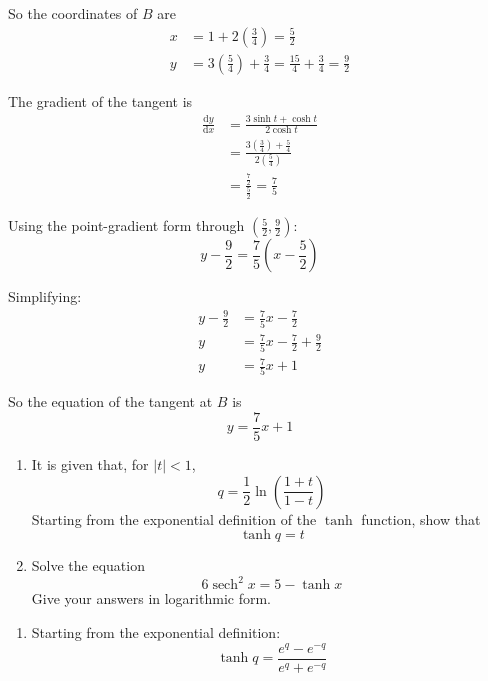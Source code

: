 \documentclass[leqno]{article}
\begin{document}
\begin{enumerate}[
  label=\textbf{\arabic*.},
  leftmargin=*,
  topsep=0pt,
  partopsep=0pt,
  parsep=0pt
]
\begin{djsSolution}
\begin{enumerate}[label=\textbf{(\alph*)}]
  So the coordinates of $B$ are
  \begin{align*}
  x&=1+2\left(\frac34\right)=\frac52\\
  y&=3\left(\frac54\right)+\frac34=\frac{15}{4}+\frac34=\frac92
  \end{align*}

  The gradient of the tangent is
  \begin{align*}
  \frac{\mathrm{d}y}{\mathrm{d}x}
  &=\frac{3\sinh t+\cosh t}{2\cosh t}\\
  &=\frac{3\left(\frac34\right)+\frac54}{2\left(\frac54\right)}\\
  &=\frac{\frac72}{\frac52}
  =\frac75
  \end{align*}

  Using the point-gradient form through $\left(\frac52,\frac92\right)$:
  \[
  y-\frac92=\frac75\left(x-\frac52\right)
  \]

  Simplifying:
  \begin{align*}
  y-\frac92&=\frac75x-\frac72\\
  y&=\frac75x-\frac72+\frac92\\
  y&=\frac75x+1
  \end{align*}

  So the equation of the tangent at $B$ is
  \[
  y=\frac75x+1
  \]
\end{enumerate}
\end{djsSolution}


\newpage

\questionitem

\begin{enumerate}[label=\textbf{(\alph*)}]
  \item It is given that, for $|t|<1$,
  \[
  q = \frac{1}{2}\ln\left(\frac{1+t}{1-t}\right)
  \]
  Starting from the exponential definition of the $\tanh$ function, show that
  \[
  \tanh q = t
  \]
  \item Solve the equation
  \[
  6\operatorname{sech}^2 x = 5 - \tanh x
  \]
  Give your answers in logarithmic form.  \\
\end{enumerate}

\vspace*{10pt}

\begin{djsSolution}
\begin{enumerate}[label=\textbf{(\alph*)}]
  \item Starting from the exponential definition:
\[
\tanh q=\frac{e^q-e^{-q}}{e^q+e^{-q}}
\]


\end{enumerate}
\end{djsSolution}
\end{enumerate}
\end{document}

